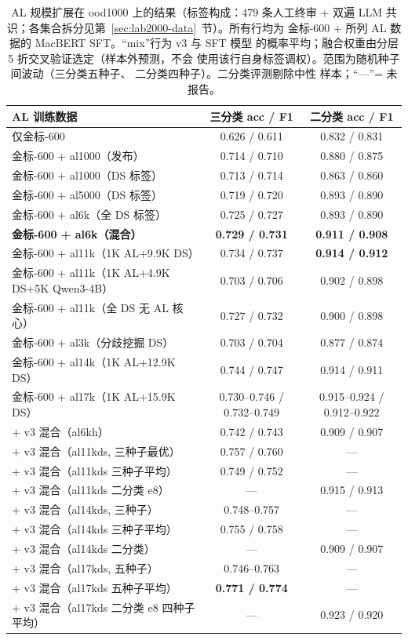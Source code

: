 \documentclass[11pt,a4paper]{article}
\begin{document}
\begin{table}[H]
\centering\footnotesize
\caption{AL 规模扩展在 ood1000 上的结果（标签构成：479 条人工终审
+ 双遍 LLM 共识；各集合拆分见第~\ref{sec:lab2000-data}~节）。所有行均为
金标-600 + 所列 AL 数据的 MacBERT SFT。“mix”行为 v3 与 SFT 模型
的概率平均；融合权重由分层 5 折交叉验证选定（样本外预测，不会
使用该行自身标签调权）。范围为随机种子间波动（三分类五种子、
二分类四种子）。二分类评测剔除中性
样本；“---”= 未报告。}
\label{tab:al-scaling}
\begin{tabular}{lcc}
\toprule
AL 训练数据 & 三分类 acc / F1 & 二分类 acc / F1 \\
\midrule
仅金标-600                    & 0.626 / 0.611 & 0.832 / 0.831 \\
金标-600 + al1000（发布）      & 0.714 / 0.710 & 0.880 / 0.875 \\
金标-600 + al1000（DS 标签）   & 0.713 / 0.714 & 0.863 / 0.860 \\
金标-600 + al5000（DS 标签）   & 0.719 / 0.720 & 0.893 / 0.890 \\
金标-600 + al6k（全 DS 标签）  & 0.725 / 0.727 & 0.893 / 0.890 \\
\textbf{金标-600 + al6k（混合）}& \textbf{0.729 / 0.731} & \textbf{0.911 / 0.908} \\
金标-600 + al11k（1K AL+9.9K DS） & 0.734 / 0.737 & \textbf{0.914 / 0.912} \\
金标-600 + al11k（1K AL+4.9K DS+5K Qwen3-4B） & 0.703 / 0.706 & 0.902 / 0.898 \\
金标-600 + al11k（全 DS 无 AL 核心） & 0.727 / 0.732 & 0.900 / 0.898 \\
金标-600 + al3k（分歧挖掘 DS）   & 0.703 / 0.704 & 0.877 / 0.874 \\
金标-600 + al14k（1K AL+12.9K DS） & 0.744 / 0.747 & 0.914 / 0.911 \\
金标-600 + al17k（1K AL+15.9K DS） & 0.730--0.746 / 0.732--0.749 & 0.915--0.924 / 0.912--0.922 \\
\midrule
+ v3 混合（al6kh）                    & 0.742 / 0.743 & 0.909 / 0.907 \\
+ v3 混合（al11kds, 三种子最优）        & 0.757 / 0.760 & --- \\
+ v3 混合（al11kds 三种子平均）          & 0.749 / 0.752 & --- \\
+ v3 混合（al11kds 二分类 e8）        & --- & 0.915 / 0.913 \\
+ v3 混合（al14kds, 三种子）          & 0.748--0.757 & --- \\
+ v3 混合（al14kds 三种子平均）        & 0.755 / 0.758 & --- \\
+ v3 混合（al14kds 二分类）           & --- & 0.909 / 0.907 \\
+ v3 混合（al17kds, 五种子）          & 0.746--0.763 & --- \\
+ v3 混合（al17kds 五种子平均）        & \textbf{0.771 / 0.774} & --- \\
+ v3 混合（al17kds 二分类 e8 四种子平均） & --- & 0.923 / 0.920 \\
\bottomrule
\end{tabular}
\end{table}
\end{document}
